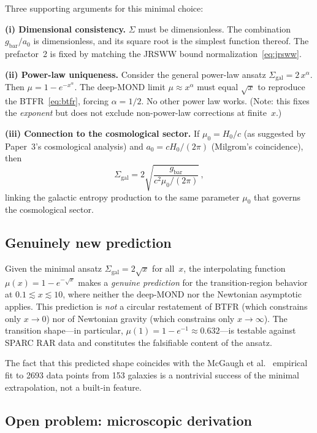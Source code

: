 \documentclass[prd,twocolumn,superscriptaddress,longbibliography,floatfix]{revtex4-2}
\begin{document}
Three supporting arguments for this minimal choice:

\textbf{(i) Dimensional consistency.}
$\Sigma$ must be dimensionless. The combination
$g_{\mathrm{bar}}/a_0$ is dimensionless, and its square root is
the simplest function thereof. The prefactor~2 is fixed by matching
the JRSWW bound normalization~\eqref{eq:jrsww}.

\textbf{(ii) Power-law uniqueness.}
Consider the general power-law ansatz $\Sigma_{\mathrm{gal}} = 2\,x^\alpha$.
Then $\mu = 1 - e^{-x^\alpha}$. The deep-MOND limit
$\mu \approx x^\alpha$ must equal $\sqrt{x}$ to reproduce the
BTFR~\eqref{eq:btfr}, forcing $\alpha = 1/2$. No other power law
works. (Note: this fixes the \emph{exponent} but does not exclude
non-power-law corrections at finite~$x$.)

\textbf{(iii) Connection to the cosmological sector.}
If $\mu_0 = H_0/c$ (as suggested by Paper~3's cosmological
analysis) and $a_0 = cH_0/(2\pi)$ (Milgrom's coincidence), then
\begin{equation}
  \Sigma_{\mathrm{gal}} = 2\sqrt{\frac{g_{\mathrm{bar}}}
  {c^2\mu_0/(2\pi)}}\,,
  \label{eq:sigma-cosmo}
\end{equation}
linking the galactic entropy production to the same parameter
$\mu_0$ that governs the cosmological sector.

\subsection{Genuinely new prediction}

Given the minimal ansatz $\Sigma_{\mathrm{gal}} = 2\sqrt{x}$ for
all~$x$, the interpolating function
$\mu(x) = 1 - e^{-\sqrt{x}}$ makes a \emph{genuine prediction} for
the transition-region behavior at $0.1 \lesssim x \lesssim 10$,
where neither the deep-MOND nor the Newtonian asymptotic applies.
This prediction is \emph{not} a circular restatement of BTFR (which
constrains only $x \to 0$) nor of Newtonian gravity (which constrains
only $x \to \infty$).
The transition shape---in particular, $\mu(1) = 1 - e^{-1} \approx 0.632$---is
testable against SPARC RAR data and constitutes the falsifiable
content of the ansatz.

The fact that this predicted shape coincides with the McGaugh et
al.~\cite{McGaugh2016} empirical fit to 2693 data points from 153
galaxies is a nontrivial success of the minimal extrapolation, not
a built-in feature.

\subsection{Open problem: microscopic derivation}
\end{document}
